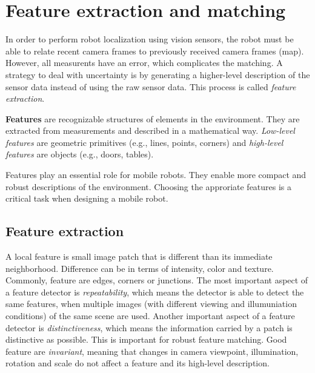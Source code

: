 \section{Feature extraction and matching}
\label{sec:computer-vision-feature-extraction-matching}
In order to perform robot localization using vision sensors, the robot must be able to relate recent camera frames to previously received camera frames (map).
However, all measurents have an error, which complicates the matching.
A strategy to deal with uncertainty is by generating a higher-level description of the sensor data instead of using the raw sensor data.
This process is called \textit{feature extraction}.

\begin{mydef}
\textbf{Features} are recognizable structures of elements in the environment.
They are extracted from measurements and described in a mathematical way.
\textit{Low-level features} are geometric primitives (e.g., lines, points, corners) and \textit{high-level features} are objects (e.g., doors, tables).
\end{mydef}

Features play an essential role for mobile robots.
They enable more compact and robust descriptions of the environment.
Choosing the approriate features is a critical task when designing a mobile robot.

\subsection{Feature extraction}
\label{sec:background-feature-extraction}
A local feature is small image patch that is different than its immediate neighborhood.
Difference can be in terms of intensity, color and texture.
Commonly, feature are edges, corners or junctions.
The most important aspect of a feature detector is \textit{repeatability}, which means the detector is able to detect the same features, when multiple images (with different viewing and illumuniation conditions) of the same scene are used.
Another important aspect of a feature detector is \textit{distinctiveness}, which means the information carried by a patch is distinctive as possible.
This is important for robust feature matching.
Good feature are \textit{invariant}, meaning that changes in camera viewpoint, illumination, rotation and scale do not affect a feature and its high-level description.

